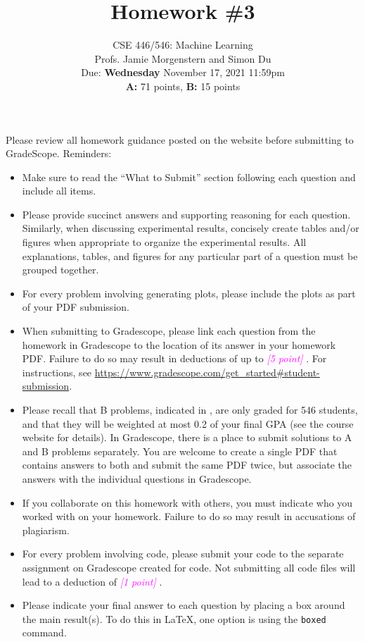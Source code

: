\documentclass{article}
\date{{}}
\newcommand{\1}{\mathbf{1}}
\newcommand{\points}[1]{\small\textcolor{magenta}{\emph{[#1 point\ifthenelse{\equal{#1}{1}}{}{s}]}} \normalsize}
\newcounter{aprob}
\begin{document}
\setcounter{aprob}{0}
\title{Homework \#3}
\author{
    \normalsize{CSE 446/546: Machine Learning}\\
    \normalsize{Profs. Jamie Morgenstern and Simon Du}\\
    \normalsize{Due: \textbf{Wednesday} November 17, 2021 11:59pm}\\
    \normalsize{\textbf{A:} 71 points, \textbf{B:} 15 points}
}
\date{{}}
\maketitle

\noindent Please review all homework guidance posted on the website before submitting to GradeScope. Reminders:
\begin{itemize}
    \item Make sure to read the ``What to Submit'' section following each question and include all items.
    \item Please provide succinct answers and supporting reasoning for each question. Similarly, when discussing experimental results, concisely create tables and/or figures when appropriate to organize the experimental results. All explanations, tables, and figures for any particular part of a question must be grouped together. 
    \item For every problem involving generating plots, please include the plots as part of your PDF submission.
    \item When submitting to Gradescope, please link each question from the homework in Gradescope to the location of its answer in your homework PDF. Failure to do so may result in deductions of up to \points{5}. For instructions, see \url{https://www.gradescope.com/get_started#student-submission}.
    \item Please recall that B problems, indicated in , are only graded for 546 students, and that they will be weighted at most 0.2 of your final GPA (see the course website for details). In Gradescope, there is a place to submit solutions to A and B problems separately. You are welcome to create a single PDF that contains answers to both and submit the same PDF twice, but associate the answers with the individual questions in Gradescope. 
    \item If you collaborate on this homework with others, you must indicate who you worked with on your homework. Failure to do so may result in accusations of plagiarism.
    \item For every problem involving code, please submit your code to the separate assignment on Gradescope created for code. Not submitting all code files will lead to a deduction of \points{1}.  
    \item Please indicate your final answer to each question by placing a box around the main result(s). To do this in \LaTeX, one option is using the \texttt{boxed} command.
\end{itemize}
\end{document}
